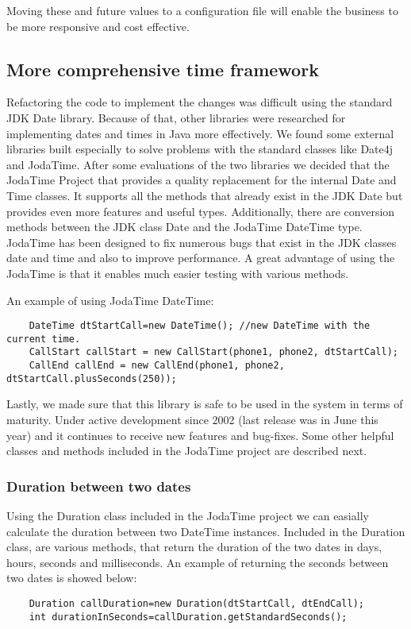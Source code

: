 Moving these and future values to a configuration file will enable the business to be more responsive and cost effective.

\subsection{More comprehensive time framework}
Refactoring the code to implement the changes was difficult using the standard JDK Date library. Because of that, other libraries were researched for implementing dates and times in Java more effectively. We found some external libraries built especially to solve problems with the standard classes like Date4j and JodaTime. After some evaluations of the two libraries we decided that the JodaTime Project that provides a quality replacement for the internal Date and Time classes. It supports all the methods that already exist in the JDK Date but provides even more features and useful types. Additionally, there are conversion methods between the JDK class Date and the JodaTime DateTime type. JodaTime has been designed to fix numerous bugs that exist in the JDK classes date and time and also to improve performance. A great advantage of using the JodaTime is that it enables much easier testing with various methods. 

An example of using JodaTime DateTime:
\begin{lstlisting}
	DateTime dtStartCall=new DateTime(); //new DateTime with the current time. 
	CallStart callStart = new CallStart(phone1, phone2, dtStartCall);
	CallEnd callEnd = new CallEnd(phone1, phone2, dtStartCall.plusSeconds(250));
\end{lstlisting}

Lastly, we made sure that this library is safe to be used in the system in terms of maturity. Under active development since 2002 (last release was in June this year) and it continues to receive new features and bug-fixes. Some other helpful classes and methods included in the JodaTime project are described next.

\subsubsection{Duration between two dates}
Using the Duration class included in the JodaTime project we can easially calculate the duration between two DateTime instances. Included in the Duration class, are various methods, that return the duration of the two dates in days, hours, seconds and milliseconds. An example of returning the seconds between two dates is showed below:
\begin{lstlisting}
	Duration callDuration=new Duration(dtStartCall, dtEndCall);
	int durationInSeconds=callDuration.getStandardSeconds();
\end{lstlisting}

